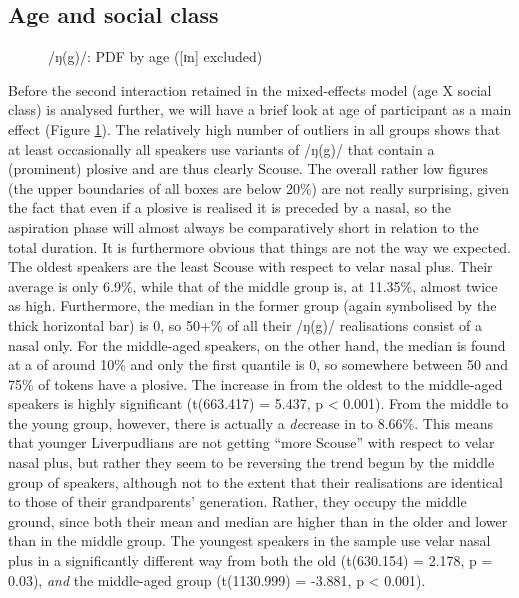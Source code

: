 \subsection{Age and social class}
\label{sec.prod.res.con.ng.ageclass}

\begin{figure}[h]
	\centering
		\resizebox{0.5\linewidth}{!}{} 
	\caption{/ŋ(g)/: PDF by age ([ɪn] excluded)}
	\label{fig.box.ng.tot}
\end{figure}

Before the second interaction retained in the mixed-effects model (age X social class) is analysed further, we will have a brief look at age of participant as a main effect (Figure \ref{fig.box.ng.tot}).
The relatively high number of outliers in all groups shows that at least occasionally all speakers use variants of /ŋ(g)/ that contain a (prominent) plosive and are thus clearly Scouse.
The overall rather low figures (the upper boundaries of all boxes are below 20\%) are not really surprising, given the fact that even if a plosive is realised it is preceded by a nasal, so the aspiration phase will almost always be comparatively short in relation to the total duration.
It is furthermore obvious that things are not the way we expected.
The oldest speakers are the least Scouse with respect to velar nasal plus.
Their average  is only 6.9\%, while that of the middle group is, at 11.35\%, almost twice as high.
Furthermore, the median in the former group (again symbolised by the thick horizontal bar) is 0, so 50+\% of all their /ŋ(g)/ realisations consist of a nasal only.
For the middle-aged speakers, on the other hand, the median is found at a  of around 10\% and only the first quantile is 0, so somewhere between 50 and 75\% of tokens have a plosive.
The increase in  from the oldest to the middle-aged speakers is highly significant (t(663.417) = 5.437, p < 0.001).
From the middle to the young group, however, there is actually a \emph{de}crease in  to 8.66\%.
This means that younger Liverpudlians are not getting ``more Scouse'' with respect to velar nasal plus, but rather they seem to be reversing the trend begun by the middle group of speakers, although not to the extent that their realisations are identical to those of their grandparents' generation.
Rather, they occupy the middle ground, since both their mean and median are higher than in the older and lower than in the middle group.
The youngest speakers in the sample use velar nasal plus in a significantly different way from both the old (t(630.154) = 2.178, p = 0.03), \emph{and} the middle-aged group (t(1130.999) = -3.881, p < 0.001).

